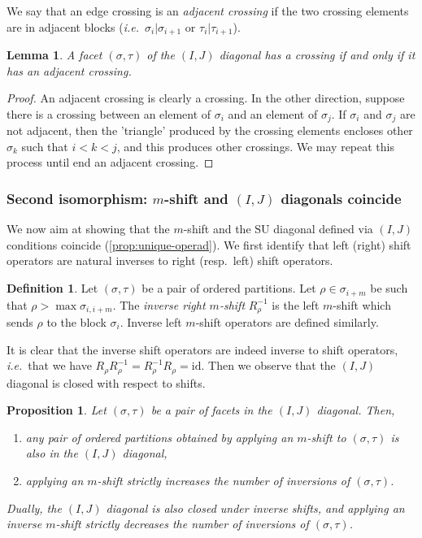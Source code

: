 \documentclass{amsart}
\newtheorem{proposition}[theorem]{Proposition}
\newtheorem{lemma}[theorem]{Lemma}
\theoremstyle{definition}
\newtheorem{definition}[theorem]{Definition}
\newcommand{\ie}{\textit{i.e.}~} %
\newcommand{\SU}{\mathrm{SU}}
\newcommand{\id}{\mathrm{id}}
\begin{document}
We say that an edge crossing is an \emph{adjacent crossing} if the two crossing elements are in adjacent blocks (\ie $\sigma_i|\sigma_{i+1}$ or $\tau_i|\tau_{i+1}$).

\begin{lemma}
    \label{lem:adjacent-crossing}
A facet $(\sigma,\tau)$ of the $(I,J)$ diagonal has a crossing if and only if it has an adjacent crossing.
\end{lemma}

\begin{proof}
An adjacent crossing is clearly a crossing. In the other direction, suppose there is a crossing between an element of $\sigma_i$ and an element of $\sigma_j$. If $\sigma_i$ and $\sigma_j$ are not adjacent, then the 'triangle' produced by the crossing elements encloses other $\sigma_k$ such that $i<k<j$, and this produces other crossings. We may repeat this process until end an adjacent crossing.
\end{proof}




\subsubsection{Second isomorphism: $m$-shift and $(I,J)$ diagonals coincide}\label{sec:Iso m-shifts to IJ}

We now aim at showing that the $m$-shift and the $\SU$ diagonal defined via $(I,J)$ conditions coincide (\cref{prop:unique-operad}).
We first identify that left (right) shift operators are natural inverses to right (resp.~left) shift operators.

\begin{definition} 
\label{def:inverse-shift}
Let $(\sigma,\tau)$ be a pair of ordered partitions. 
Let $\rho \in \sigma_{i+m}$ be such that $\rho>\max \sigma_{i,i+m}$.
The \emph{inverse right $m$-shift} $R_\rho^{-1}$ is the left $m$-shift which sends $\rho$ to the block $\sigma_i$. 
Inverse left $m$-shift operators are defined similarly. 
\end{definition}
It is clear that the inverse shift operators are indeed inverse to shift operators, \ie that we have $R_\rho R_\rho^{-1}= R_\rho^{-1} R_\rho= \id$.
Then we observe that the $(I,J)$ diagonal is closed with respect to shifts.

\begin{proposition} 
    \label{lem:IJ-closed-under-shifts}
    Let $(\sigma,\tau)$ be a pair of facets in the $(I,J)$ diagonal.
    Then,
    \begin{enumerate}
        \item any pair of ordered partitions obtained by applying an $m$-shift to $(\sigma,\tau)$ is also in the $(I,J)$ diagonal,
        \item applying an $m$-shift strictly increases the number of inversions of $(\sigma,\tau)$.
    \end{enumerate}
    Dually, the $(I,J)$ diagonal is also closed under inverse shifts, and applying an inverse $m$-shift strictly decreases the number of inversions of $(\sigma,\tau)$.
\end{proposition}
\end{document}
